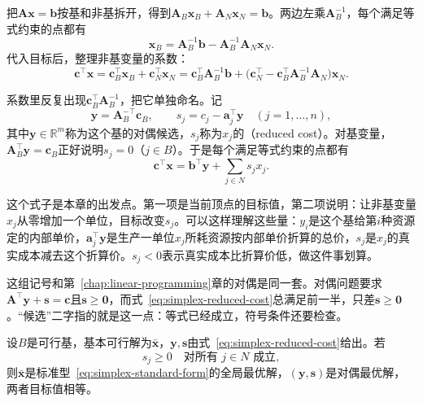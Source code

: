把$\bm{A}\bm{x}=\bm{b}$按基和非基拆开，得到$\bm{A}_B\bm{x}_B+\bm{A}_N\bm{x}_N=\bm{b}$。两边左乘$\bm{A}_B^{-1}$，每个满足等式约束的点都有
\begin{equation}
 \bm{x}_B=\bm{A}_B^{-1}\bm{b}-\bm{A}_B^{-1}\bm{A}_N\bm{x}_N.
 \label{eq:simplex-basic-form}
\end{equation}
代入目标后，整理非基变量的系数：
\[
 \bm{c}^\top\bm{x}
 =\bm{c}_B^\top\bm{x}_B+\bm{c}_N^\top\bm{x}_N
 =\bm{c}_B^\top\bm{A}_B^{-1}\bm{b}
 +\bigl(\bm{c}_N^\top-\bm{c}_B^\top\bm{A}_B^{-1}\bm{A}_N\bigr)\bm{x}_N.
\]

系数里反复出现$\bm{c}_B^\top\bm{A}_B^{-1}$，把它单独命名。记
\begin{equation}
 \bm{y}=\bm{A}_B^{-\top}\bm{c}_B,
 \qquad
 s_j=c_j-\bm{a}_j^\top\bm{y}\quad(j=1,\ldots,n),
 \label{eq:simplex-reduced-cost}
\end{equation}
其中$\bm{y}\in\mathbb{R}^m$称为这个基的对偶候选，$s_j$称为$x_j$的（reduced cost）。对基变量，$\bm{A}_B^\top\bm{y}=\bm{c}_B$正好说明$s_j=0$（$j\in B$）。于是每个满足等式约束的点都有
\begin{equation}
 \bm{c}^\top\bm{x}=\bm{b}^\top\bm{y}+\sum_{j\in N}s_jx_j.
 \label{eq:simplex-objective-form}
\end{equation}

这个式子是本章的出发点。第一项是当前顶点的目标值，第二项说明：让非基变量$x_j$从零增加一个单位，目标改变$s_j$。可以这样理解这些量：$y_i$是这个基给第$i$种资源定的内部单价，$\bm{a}_j^\top\bm{y}$是生产一单位$x_j$所耗资源按内部单价折算的总价，$s_j$是$x_j$的真实成本减去这个折算价。$s_j<0$表示真实成本比折算价低，做这件事划算。

这组记号和第~\ref{chap:linear-programming}章的对偶是同一套。对偶问题要求$\bm{A}^\top\bm{y}+\bm{s}=\bm{c}$且$\bm{s}\geq\bm{0}$，而式~\eqref{eq:simplex-reduced-cost}总满足前一半，只差$\bm{s}\geq\bm{0}$。“候选”二字指的就是这一点：等式已经成立，符号条件还要检查。

\begin{theorem}[最优性判别]
 \label{thm:simplex-optimality}
 设$B$是可行基，基本可行解为$\bar{\bm{x}}$，$\bm{y},\bm{s}$由式~\eqref{eq:simplex-reduced-cost}给出。若
 \begin{equation}
  s_j\geq 0\quad\text{对所有 }j\in N\text{ 成立},
  \label{eq:simplex-optimality-condition}
 \end{equation}
 则$\bar{\bm{x}}$是标准型~\eqref{eq:simplex-standard-form}的全局最优解，$(\bm{y},\bm{s})$是对偶最优解，两者目标值相等。
\end{theorem}

